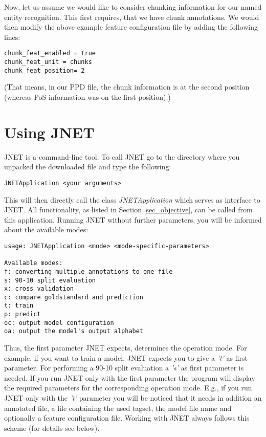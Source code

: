 \documentclass[11pt,a4paper,halfparskip]{scrartcl}
\begin{document}
Now, let us assume we would like to consider chunking information for
our named entity recognition. This first requires, that we have chunk
annotations. We would then modify the above example feature
configuration file by adding the following lines:

\begin{verbatim}
chunk_feat_enabled = true
chunk_feat_unit = chunks
chunk_feat_position= 2
\end{verbatim}

(That means, in our PPD file, the chunk information is at the second
position (whereas PoS information was on the first position).)


\section{Using JNET}



JNET is a command-line tool. To call JNET go to the directory where
you unpacked the downloaded file and type the following:

\begin{verbatim}
JNETApplication <your arguments>
\end{verbatim}

This will then directly call the class 
\textit{JNETApplication} which serves as interface to JNET.  All
functionality, as listed in Section \ref{sec_objective}, can be called
from this application.
Running JNET without further parameters, you will be informed about
the available modes:
\begin{verbatim} 
usage: JNETApplication <mode> <mode-specific-parameters>

Available modes:
f: converting multiple annotations to one file
s: 90-10 split evaluation
x: cross validation
c: compare goldstandard and prediction
t: train
p: predict
oc: output model configuration
oa: output the model's output alphabet
\end{verbatim}

Thus, the first parameter JNET expects, determines the operation mode.
For example, if you want to train a model, JNET expects you to give a
\textit{'t'} as first parameter.  For performing a 90-10 split
evaluation a \textit{'s'} as first parameter is needed.  If you run
JNET only with the first parameter the program will display the
required parameters for the corresponding operation mode. E.g., if you
run JNET only with the \textit{'t'} parameter you will be noticed that
it needs in addition an annotated file, a file containing the used
tagset, the model file name and optionally a feature configuration
file. Working with JNET always follows this scheme (for details see
below).
\end{document}
